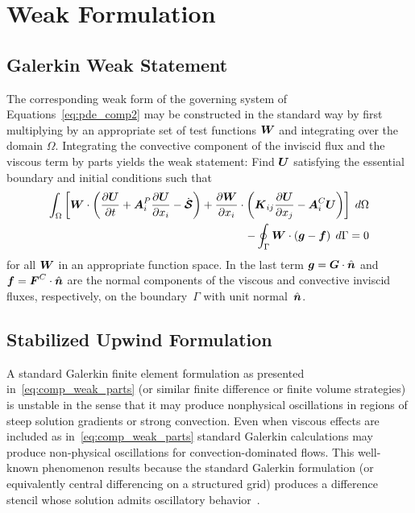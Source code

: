 \section{Weak Formulation\label{sec:comp_ns_weak}}
\subsection{Galerkin Weak Statement}
The corresponding weak form of the governing system of Equations~\eqref{eq:pde_comp2} may be constructed in the standard way by first multiplying by an appropriate set of test functions ${\boldsymbol{W}}$ and integrating  over the domain $\Omega$.  Integrating the convective component of the inviscid flux and the viscous term by parts yields the weak statement: Find ${\boldsymbol{U}}$ satisfying the essential boundary and initial conditions such that
\begin{eqnarray}
  \label{eq:comp_weak_parts}
  \int_\Omega  \left[ {\boldsymbol{W}}\cdot\left({\frac{\partial{{\boldsymbol{U}}}}{\partial{t}}} + {\boldsymbol{A}}^P_i {\frac{\partial{{\boldsymbol{U}}}}{\partial{x_i}}} - \dot{{\boldsymbol{\mathcal{S}}}} \right) + {\frac{\partial{{\boldsymbol{W}}}}{\partial{x_i}}} \cdot \left( {\boldsymbol{K}}_{ij} {\frac{\partial{{\boldsymbol{U}}}}{\partial{x_j}}} - {\boldsymbol{A}}^C_i {\boldsymbol{U}}\right)\right] \; d\Omega \nonumber \\ - \oint_\Gamma {\boldsymbol{W}}\cdot\left({\boldsymbol{g}} - {\boldsymbol{f}}\right) \; d\Gamma = 0
\end{eqnarray}
for all ${\boldsymbol{W}}$ in an appropriate function space. In the last term ${\boldsymbol{g}} = {\boldsymbol{G}}\cdot\hat{{\boldsymbol{n}}}$ and ${\boldsymbol{f}} = {\boldsymbol{F}}^C\cdot\hat{{\boldsymbol{n}}}$ are the normal components of the viscous and convective inviscid fluxes, respectively, on the boundary~$\Gamma$ with unit normal~$\hat{{\boldsymbol{n}}}$.


\subsection{Stabilized Upwind Formulation\label{sect:comp_sc}}
A standard Galerkin finite element formulation as presented in~\eqref{eq:comp_weak_parts}  (or similar finite difference or finite volume strategies) is unstable in the sense that it may produce nonphysical oscillations in regions of steep solution gradients or strong convection. Even when viscous effects are included as in~\eqref{eq:comp_weak_parts} standard Galerkin calculations may produce non-physical oscillations for convection-dominated flows. This well-known phenomenon results because the standard Galerkin formulation (or equivalently central differencing on a structured grid) produces a difference stencil whose solution admits oscillatory behavior~\cite{christie_griffiths_mitchell_zienkiewicz,finite_elements_vol_6,fries_matthies_supg_meshfree}.

